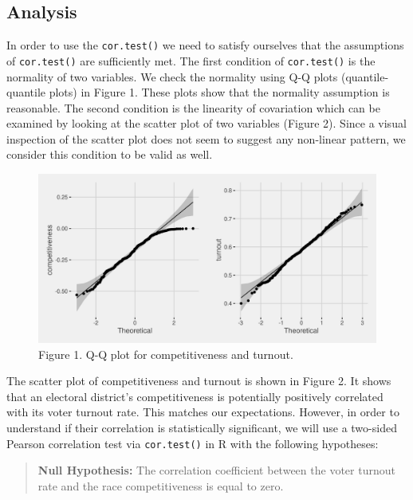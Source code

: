 \documentclass[
]{article}
\begin{document}
\hypertarget{analysis}{%
\subsection{Analysis}\label{analysis}}

In order to use the \texttt{cor.test()} we need to satisfy ourselves
that the assumptions of \texttt{cor.test()} are sufficiently met. The
first condition of \texttt{cor.test()} is the normality of two
variables. We check the normality using Q-Q plots (quantile-quantile
plots) in Figure 1. These plots show that the normality assumption is
reasonable. The second condition is the linearity of covariation which
can be examined by looking at the scatter plot of two variables (Figure
2). Since a visual inspection of the scatter plot does not seem to
suggest any non-linear pattern, we consider this condition to be valid
as well.

\begin{figure}
\includegraphics[width=1\linewidth]{images/cow_plot} \caption{Figure 1. Q-Q plot for competitiveness and turnout.}\label{fig:unnamed-chunk-2}
\end{figure}

The scatter plot of competitiveness and turnout is shown in Figure 2. It
shows that an electoral district's competitiveness is potentially
positively correlated with its voter turnout rate. This matches our
expectations. However, in order to understand if their correlation is
statistically significant, we will use a two-sided Pearson correlation
test via \texttt{cor.test()} in R with the following hypotheses:

\begin{quote}
\textbf{Null Hypothesis:} The correlation coefficient between the voter
turnout rate and the race competitiveness is equal to zero.
\end{quote}
\end{document}
